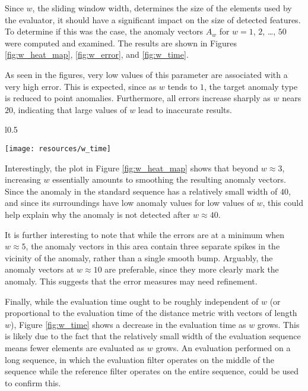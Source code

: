 Since $w$, the sliding window width, determines the size of the elements used by the evaluator, it should have a significant impact on the size of detected features. To determine if this was the case, the anomaly vectors $A_w$ for $w = 1$, $2$, \dots, $50$ were computed and examined. The results are shown in Figures \ref{fig:w_heat_map}, \ref{fig:w_error}, and \ref{fig:w_time}.

As seen in the figures, very low values of this parameter are associated with a very high error. This is expected, since as $w$ tends to $1$, the target anomaly type is reduced to point anomalies. Furthermore, all errors increase sharply as $w$ nears $20$, indicating that large values of $w$ lead to inaccurate results.

\begin{wrapfigure}{l}{0.5\textwidth}
    \vspace{-25pt}
    \begin{center}
        \texttt{[image: resources/w\_time]}
    \end{center}
    \vspace{-20pt}
    \caption{\small{Evaluation times for the anomaly vectors $A_w$.}}
    \label{fig:w_time}
    \vspace{-20pt}
\end{wrapfigure}

Interestingly, the plot in Figure \ref{fig:w_heat_map} shows that beyond $w \approx 3$, increasing $w$ essentially amounts to smoothing the resulting anomaly vectors. Since the anomaly in the standard sequence has a relatively small width of $40$, and since its surroundings have low anomaly values for low values of $w$, this could help explain why the anomaly is not detected after $w \approx 40$. 

It is further interesting to note that while the errors are at a minimum when $w \approx 5$, the anomaly vectors in this area contain three separate spikes in the vicinity of the anomaly, rather than a single smooth bump. Arguably, the anomaly vectors at $w \approx 10$ are preferable, since they more clearly mark the anomaly. This suggests that the error measures may need refinement.

Finally, while the evaluation time ought to be roughly independent of $w$ (or proportional to the evaluation time of the distance metric with vectors of length $w$), Figure \ref{fig:w_time} shows a decrease in the evaluation time as $w$ grows. This is likely due to the fact that the relatively small width of the evaluation sequence means fewer elements are evaluated as $w$ grows. An evaluation performed on a long sequence, in which the evaluation filter operates on the middle of the sequence while the reference filter operates on the entire sequence, could be used to confirm this.

